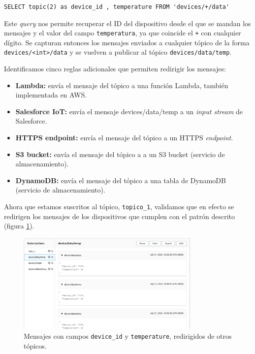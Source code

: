\documentclass[10pt]{article}
\begin{document}
\begin{lstlisting}
SELECT topic(2) as device_id , temperature FROM 'devices/+/data'
\end{lstlisting}

Este \textit{query} nos permite recuperar el ID del dispositivo desde el que se mandan los mensajes y el valor del campo \texttt{temperatura}, ya que coincide el \texttt{+} con cualquier dígito. Se capturan entonces los mensajes enviados a cualquier tópico de la forma \texttt{devices/<int>/data} y se vuelven a publicar al tópico \texttt{devices/data/temp}.

Identificamos cinco reglas adicionales que permiten redirigir los mensajes:

\begin{itemize}
    \item \textbf{Lambda:} envía el mensaje del tópico a una función Lambda, también implementada en AWS.
    \item \textbf{Salesforce IoT:} envía el mensaje devices/data/temp a un \textit{input stream} de Salesforce. 
    \item \textbf{HTTPS endpoint:} envía el mensaje del tópico a un HTTPS \textit{endpoint}.
    \item \textbf{S3 bucket:} envía el mensaje del tópico a a un S3 bucket (servicio de almacenamiento).
    \item \textbf{DynamoDB:} envía el mensaje del tópico a una tabla de DynamoDB (servicio de almacenamiento).
\end{itemize}

Ahora que estamos suscritos al tópico, \texttt{topico\_1}, validamos que en efecto se redirigen los mensajes de los dispositivos que cumplen con el patrón descrito (figura \ref{fig:mensajes_redirigidos_de_otros_topicos}).

\begin{figure}[H]
    \centering
    \includegraphics[width=0.8\textwidth]{Images/AWS_console_temperature_message_rceived.png}
    \caption{Mensajes con campos \texttt{device\_id} y \texttt{temperature}, redirigidos de otros tópicos.}
    \label{fig:mensajes_redirigidos_de_otros_topicos}
\end{figure}
\end{document}
